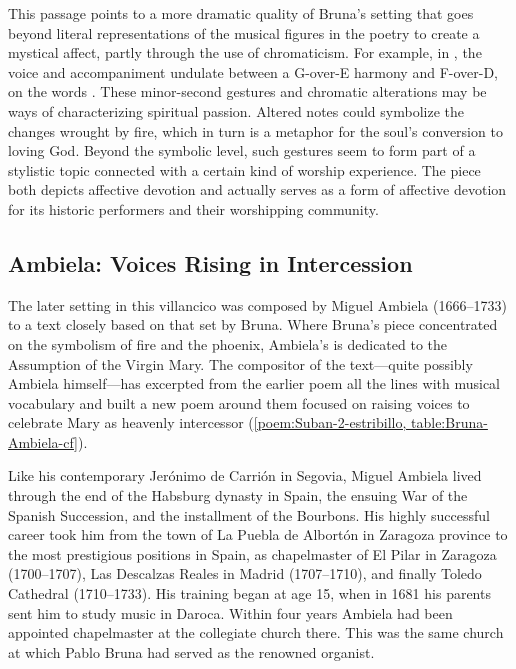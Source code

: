 This passage points to a more dramatic quality of Bruna's setting that goes
beyond literal representations of the musical figures in the poetry to create a
mystical affect, partly through the use of chromaticism.
For example, in , the voice and accompaniment undulate between a
G-over-E\fl{} harmony and F\sh-over-D, on the words .
These minor-second gestures and chromatic alterations may be
ways of characterizing spiritual passion.
Altered notes could symbolize the changes wrought by fire, which in turn is a
metaphor for the soul's conversion to loving God.  
Beyond the symbolic level, such gestures seem to form part of a stylistic topic
connected with a certain kind of worship experience.  
The piece both depicts affective devotion and actually serves as a form of
affective devotion for its historic performers and their worshipping community.


\subsection{Ambiela: Voices Rising in Intercession}

The later setting in this villancico was composed by Miguel Ambiela
(1666--1733) to a text closely based on that set by Bruna.
Where Bruna's piece concentrated on the symbolism of fire and the phoenix,
Ambiela's is dedicated to the Assumption of the Virgin Mary.
The compositor of the text---quite possibly Ambiela himself---has excerpted
from the earlier poem all the lines with musical vocabulary and built a new
poem around them focused on raising voices to celebrate Mary as heavenly
intercessor (\cref{poem:Suban-2-estribillo, table:Bruna-Ambiela-cf}).



Like his contemporary Jerónimo de Carrión in Segovia, Miguel Ambiela lived
through the end of the Habsburg dynasty in Spain, the ensuing War of the
Spanish Succession, and the installment of the Bourbons.
His highly successful career took him from the town of La Puebla de Albortón in
Zaragoza province to the most prestigious positions in Spain, as chapelmaster
of El Pilar in Zaragoza (1700--1707), Las Descalzas Reales in Madrid
(1707--1710), and finally Toledo Cathedral (1710--1733).%
    \Autocites
    [1]{Calahorra:Suban}
    []{Grove}
    {Alvarez:Ambiela}
His training began at age 15, when in 1681 his parents sent him to study music
in Daroca.
Within four years Ambiela had been appointed chapelmaster at the collegiate
church there.
This was the same church at which Pablo Bruna had served as the renowned
organist.

